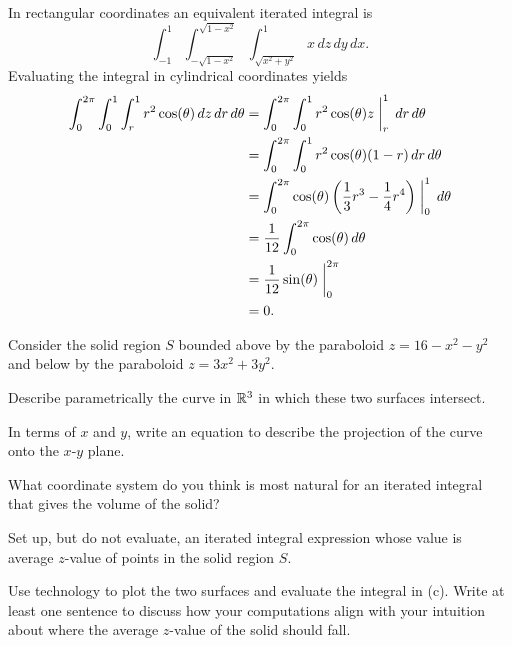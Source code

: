 \begin{exercises}
\begin{exerciseSolution}
		\item In rectangular coordinates an equivalent iterated integral is 
\[\int_{-1}^{1} \int_{-\sqrt{1-x^2}}^{\sqrt{1-x^2}} \int_{\sqrt{x^2+y^2}}^{1} x \, dz \, dy \, dx.\]
Evaluating the integral in cylindrical coordinates yields
\begin{align*}
\int_{0}^{2\pi} \int_{0}^{1} \int_{r}^{1} r^2 \cos(\theta) \, dz \, dr \, d\theta &= \int_{0}^{2\pi} \int_{0}^{1}  r^2 \cos(\theta)z\biggm|_{r}^{1} \, dr \, d\theta \\
	&= \int_{0}^{2\pi} \int_{0}^{1}  r^2 \cos(\theta)(1-r) \, dr \, d\theta \\
	&= \int_{0}^{2\pi}  \cos(\theta)\left(\frac{1}{3}r^3 - \frac{1}{4}r^4\right)\biggm|_{0}^{1} \, d\theta \\
	&= \frac{1}{12} \int_{0}^{2\pi}  \cos(\theta) \, d\theta \\
	&= \frac{1}{12}  \sin(\theta)\biggm|_{0}^{2\pi}  \\
	&= 0.
\end{align*}

	\ea
\end{exerciseSolution}

	\item Consider the solid region $S$ bounded above by the paraboloid $z = 16 - x^2 - y^2$ and below by the paraboloid $z = 3x^2 + 3y^2$.
		\ba
			\item Describe parametrically the curve in $\mathbb{R}^3$ in which these two surfaces intersect.
			\item In terms of $x$ and $y$, write an equation to describe the projection of the curve onto the $x$-$y$ plane.
			\item What coordinate system do you think is most natural for an iterated integral that gives the volume of the solid?
			\item Set up, but do not evaluate, an iterated integral expression whose value is average $z$-value of points in the solid region $S$.  
			\item Use technology to plot the two surfaces and evaluate the integral in (c).  Write at least one sentence to discuss how your computations align with your intuition about where the average $z$-value of the solid should fall. 
		\ea

 



\end{exercises}
